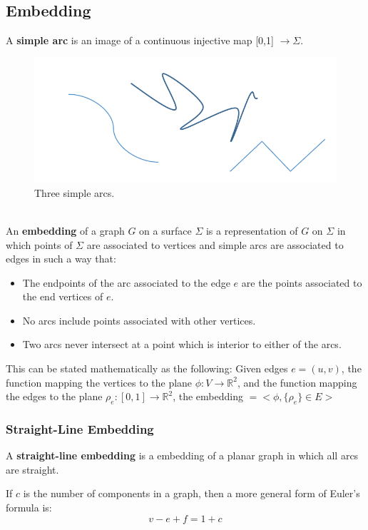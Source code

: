 \documentclass[english]{article}
\newcommand{\R}{\mathbb{R}}
\begin{document}
  \subsection{Embedding}
  A \textbf{simple arc} is an image of a continuous injective map [0,1] $\rightarrow \Sigma$.\\
  \begin{figure}[h]
      \centering
      \includegraphics[scale=.3]{simple_arcs}       
      \caption{Three simple arcs.}
      \label{fig: Figure 3}
  \end{figure}\\
  An \textbf{embedding} of a graph $G$ on a surface $\Sigma$ is a representation of $G$ on $\Sigma$ in which points of $\Sigma$ are associated to vertices and simple arcs are associated to edges in such a way that:
  \begin{itemize}
	\item The endpoints of the arc associated to the edge $e$ are the points associated to the end vertices of $e$.
	\item No arcs include points associated with other vertices.
	\item Two arcs never intersect at a point which is interior to either of the arcs.
  \end{itemize}
  This can be stated mathematically as the following: Given edges $e=(u,v)$, the function mapping the vertices to the plane $ \phi :V \rightarrow \R^2$, and the function mapping the edges to the plane $ \rho_e :[0,1] \rightarrow \R^2$, the embedding $= <\phi, \{\rho_e\} \in E >$
  \subsubsection{Straight-Line Embedding}
  A \textbf{straight-line embedding} is a embedding of a planar graph in which all arcs are straight.


  If $c$ is the number of components in a graph, then a more general form of Euler's formula is:
  \begin{equation} 
	v-e+f= 1 + c
  \end{equation}
  
\end{document}
